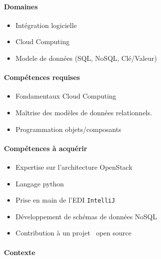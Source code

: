 \documentclass[a4paper,11pt]{article}
\begin{document}
%

\begin{note}


\paragraph*{Domaines}

\begin{itemize}
 \item Intégration logicielle
 \item Cloud Computing
 \item Modele de données (SQL, NoSQL, Clé/Valeur)
\end{itemize}

\paragraph*{Compétences requises}

\begin{itemize}
 \item Fondamentaux Cloud Computing
 \item Maîtrise des modèles de données relationnels.
 \item Programmation objets/composants
\end{itemize}

\paragraph*{Compétences à acquérir}

\begin{itemize}
 \item Expertise sur l'architecture OpenStack
 \item Langage python
 \item Prise en main de l'EDI \texttt{IntelliJ}
 \item Développement de schémas de données NoSQL
 \item Contribution à un projet \og~open source~\fg
\end{itemize}

\paragraph*{Contexte}


\end{note}
\end{document}
